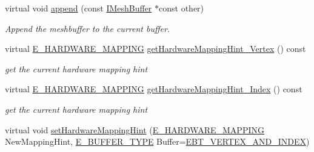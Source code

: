 \begin{DoxyCompactItemize}
virtual void \hyperlink{classirr_1_1scene_1_1IDynamicMeshBuffer_aada30374517d2a52d6264b6359a1e35c}{append} (const \hyperlink{classirr_1_1scene_1_1IMeshBuffer}{I\+Mesh\+Buffer} $\ast$const other)
\begin{DoxyCompactList}\small\item\em Append the meshbuffer to the current buffer. \end{DoxyCompactList}\item 
\mbox{\label{classirr_1_1scene_1_1IDynamicMeshBuffer_a59b514ca8f413396314d2dc93e00f6d5}} 
virtual \hyperlink{namespaceirr_1_1scene_ac7d8ee8d77da75f2580bb9bb17231c27}{E\+\_\+\+H\+A\+R\+D\+W\+A\+R\+E\+\_\+\+M\+A\+P\+P\+I\+NG} \hyperlink{classirr_1_1scene_1_1IDynamicMeshBuffer_a59b514ca8f413396314d2dc93e00f6d5}{get\+Hardware\+Mapping\+Hint\+\_\+\+Vertex} () const
\begin{DoxyCompactList}\small\item\em get the current hardware mapping hint \end{DoxyCompactList}\item 
\mbox{\label{classirr_1_1scene_1_1IDynamicMeshBuffer_a4e08eea6ffaf32cc0d23c2b2008f4abb}} 
virtual \hyperlink{namespaceirr_1_1scene_ac7d8ee8d77da75f2580bb9bb17231c27}{E\+\_\+\+H\+A\+R\+D\+W\+A\+R\+E\+\_\+\+M\+A\+P\+P\+I\+NG} \hyperlink{classirr_1_1scene_1_1IDynamicMeshBuffer_a4e08eea6ffaf32cc0d23c2b2008f4abb}{get\+Hardware\+Mapping\+Hint\+\_\+\+Index} () const
\begin{DoxyCompactList}\small\item\em get the current hardware mapping hint \end{DoxyCompactList}\item 
\mbox{\label{classirr_1_1scene_1_1IDynamicMeshBuffer_a8286f22fc7967422e2ddb5c183473247}} 
virtual void \hyperlink{classirr_1_1scene_1_1IDynamicMeshBuffer_a8286f22fc7967422e2ddb5c183473247}{set\+Hardware\+Mapping\+Hint} (\hyperlink{namespaceirr_1_1scene_ac7d8ee8d77da75f2580bb9bb17231c27}{E\+\_\+\+H\+A\+R\+D\+W\+A\+R\+E\+\_\+\+M\+A\+P\+P\+I\+NG} New\+Mapping\+Hint, \hyperlink{namespaceirr_1_1scene_a8f59a89ffef0ad8e5b2c2cb874a93e8c}{E\+\_\+\+B\+U\+F\+F\+E\+R\+\_\+\+T\+Y\+PE} Buffer=\hyperlink{namespaceirr_1_1scene_a8f59a89ffef0ad8e5b2c2cb874a93e8ca34ea664123fbc28610408e51b014dcdd}{E\+B\+T\+\_\+\+V\+E\+R\+T\+E\+X\+\_\+\+A\+N\+D\+\_\+\+I\+N\+D\+EX})

\end{DoxyCompactItemize}
